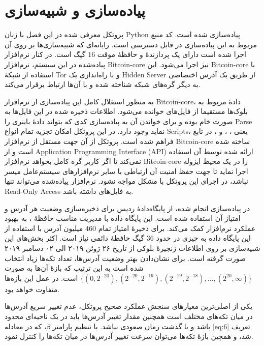 \section{پیاده‌سازی و شبیه‌سازی}
\label{subsubsection:4.3.4}


پروتکل معرفی شده در این فصل با زبان 
\gls{Python}
پیاده‌سازی شده است. کد منبع مربوط به این پیاده‌سازی در \cite{Badakhshan} قابل دسترسی است.  رایانه‌ای که شبیه‌سازی‌ها بر روی آن اجرا شده است دارای یک پردازندهٔ
و حافظهٔ موقت 
$16$
گیگ  است. در کنار نرم‌افزار پیاده‌شده در این سیستم، نرم‌افزار 
\gls{Bitcoin-core}
 نیز اجرا می‌شود. این
\gls{Bitcoin-core}
 با استفاده از شبکهٔ
\gls{Tor}
و با راه‌اندازی یک 
\gls{Hidden Server}
از طریق یک آدرس  اختصاصی به دیگر گره‌های شبکه شناخته شده و با آن‌ها ارتباط برقرار می‌کند.

به منظور استقلال کامل این پیاده‌سازی از نرم‌افزار
\gls{Bitcoin-core}،
دادهٔ مربوط به بلوک‌ها مستقیما از فایل‌های  خوانده می‌شود. اطلاعات ذخیره شده در این فایل‌ها به صورت خام بوده و برای خواندن آن به پیاده‌سازی کدی که بتواند دادهٔ باینری را 
\gls{Parse}
نماید وجود دارد. در این پروتکل امکان تجزیه تمام انواع 
\glspl{Script}،
یعنی 
، ، و ،
در تابع  فراهم شده است. پروتکل از آن جهت مستقل از نرم‌افزار 
\gls{Bitcoin-core}
ساخته شده است و از 
\gls{Application Programming Interface (API)}
ارائه شده توسط آن استفاده نمی‌کند تا اگر کاربر گره کامل بخواهد نرم‌افزار 
\gls{Bitcoin-core}
را در یک محیط ایزوله اجرا نماید تا جهت حفظ امنیت آن ارتباطی با سایر نرم‌افزار‌های سیستم‌عامل میسر نباشد، در اجرای این پروتکل با مشکل مواجه نشود. نرم‌افزار پیاده‌شده می‌تواند تنها 
\gls{Read-Only Access}
به فایل‌های   داشته باشد.

در پیاده‌سازی انجام شده، از پایگاه‌دادهٔ 
ردیس
برای ذخیره‌سازی وضعیت هر آدرس و امتیاز آن استفاده شده است. این پایگاه داده با مدیریت مناسب حافظهٔ ، به بهبود عملکرد نرم‌افزار کمک می‌کند. برای ذخیرهٔ امتیاز تمام $460$ میلیون آدرس با استفاده از این پایگاه داده به چیزی در حدود $36$ گیگ حافظهٔ دائمی نیاز است. اکثر بخش‌های این شبیه‌سازی بر روی اطلاعات زنجیرهٔ بلوکی از تاریخ ۲۶ ژوئن ۲۰۱۹ الی ۰۲ دسامبر ۲۰۱۹ صورت گرفته است. برای نشان‌دادن بهتر وضعیت آدرس‌ها،  تعداد تکه‌ها زیاد‌ انتخاب شده است به این ترتیب که بازهٔ آن‌ها به صورت
$\{(0,2^{-20}), (2^{-20}, 2^{-19}), (2^{-19}, 2^{-18}), ..., (2^{20}, \infty)\}$ 
است. در عمل این بازه‌ها متفاوت خواهد بود.


یکی از اصلی‌ترین معیار‌های سنجش عملکرد صحیح پروتکل، عدم تغییر سریع آدرس‌ها در میان تکه‌های مختلف است همچنین مقدار تغییر آدرس‌ها باید در یک ناحیه‌ای محدود باشد و با گذشت زمان صعودی نباشد. با تنظیم پارامتر $\beta$، که در معادله \eqref{eq:6} تعریف شد، و همچین بازه‌ٔ تکه‌ها می‌توان سرعت تغییر آدرس‌ها در میان تکه‌ها را کنترل نمود. 

